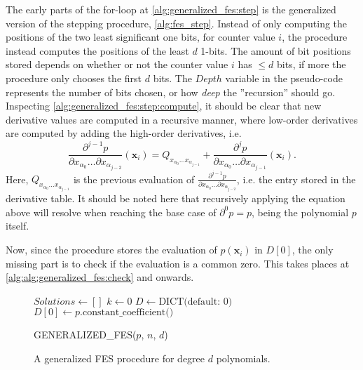 The early parts of the for-loop at \cref{alg:generalized_fes:step} is the generalized version of the stepping procedure, \cref{alg:fes_step}. Instead of only computing the positions of the two least significant one bits, for counter value $i$, the procedure instead computes the positions of the least $d$ 1-bits. The amount of bit positions stored depends on whether or not the counter value $i$ has $\leq d$ bits, if more the procedure only chooses the first $d$ bits. The $Depth$ variable in the pseudo-code represents the number of bits chosen, or how \textit{deep} the ''recursion'' should go. Inspecting \cref{alg:generalized_fes:step:compute}, it should be clear that new derivative values are computed in a recursive manner, where low-order derivatives are computed by adding the high-order derivatives, i.e.
\begin{equation} \label{eq:fes_recurse}
    \frac{\partial^{j - 1} p}{\partial x_{\alpha_0} \dots \partial x_{\alpha_{j - 2}}}(\mathbf{x}_i) = Q_{x_{\alpha_0} \dots x_{\alpha_{j - 1}}} + \frac{\partial^j p}{\partial x_{\alpha_0} \dots \partial x_{\alpha_{j - 1}}}(\mathbf{x}_i).
\end{equation}
Here, $Q_{x_{\alpha_0} \dots x_{\alpha_{j - 1}}}$ is the previous evaluation of $\frac{\partial^{j - 1} p}{\partial x_{\alpha_0} \dots \partial x_{\alpha_{j - 2}}}$, i.e. the entry stored in the derivative table. It should be noted here that recursively applying the equation above will resolve when reaching the base case of $\partial^0 p = p$, being the polynomial $p$ itself.

Now, since the procedure stores the evaluation of $p(\mathbf{x}_i)$ in $D[0]$, the only missing part is to check if the evaluation is a common zero. This takes places at \cref{alg:alg:generalized_fes:check} and onwards.

\begin{figure}[ht]
    \begin{alg}
        $Solutions \gets []$\;
        $k \gets 0$\;
        $D \gets \text{DICT(default: 0)}$\;
        $D[0] \gets p.\text{constant\_coefficient()}$\;
        \ForEach{$i = 0, \dots 2^n - 1$}{ \label{alg:generalized_fes:step}
            $Depth \gets \min(\text{HAMMING\_WEIGHT}(i), d)$\;
            $\alpha \gets \text{BITS}(i, Depth)$\;
            \ForEach{$j = Depth \dots, 1$}{
                $D[\alpha_{0\dots j - 1}] \gets D[\alpha_{0\dots j - 1}]] \oplus D[\alpha_{0\dots j}]$\; \label{alg:generalized_fes:step:compute}
            }
            \If{$D[0] = 0$}{ \label{alg:alg:generalized_fes:check}
                $Solutions[k] \gets \text{GRAY}(i)$\;
                $k\pp$\;
            }
        }
        \caption{GENERALIZED\_FES($p$, $n$, $d$)} \label{alg:generalized_fes}
    \end{alg}
    \caption{A generalized FES procedure for degree $d$ polynomials.}
\end{figure}

